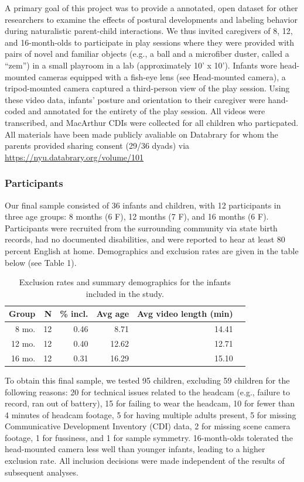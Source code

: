 \documentclass[english,man]{apa6}
\begin{document}
A primary goal of this project was to provide a annotated, open dataset
for other researchers to examine the effects of postural developments
and labeling behavior during naturalistic parent-child interactions. We
thus invited caregivers of 8, 12, and 16-month-olds to participate in
play sessions where they were provided with pairs of novel and familiar
objects (e.g., a ball and a microfiber duster, called a \enquote{zem})
in a small playroom in a lab (approximately 10' x 10'). Infants wore
head-mounted cameras equipped with a fish-eye lens (see Head-mounted
camera), a tripod-mounted camera captured a third-person view of the
play session. Using these video data, infants' posture and orientation
to their caregiver were hand-coded and annotated for the entirety of the
play session. All videos were transcribed, and MacArthur CDIs were
collected for all children who particpated. All materials have been made
publicly avaliable on Databrary for whom the parents provided sharing
consent (29/36 dyads) via \url{https://nyu.databrary.org/volume/101}

\subsubsection{Participants}\label{participants}

Our final sample consisted of 36 infants and children, with 12
participants in three age groups: 8 months (6 F), 12 months (7 F), and
16 months (6 F). Participants were recruited from the surrounding
community via state birth records, had no documented disabilities, and
were reported to hear at least 80 percent English at home. Demographics
and exclusion rates are given in the table below (see Table 1).

\begin{table}[ht]
\centering
\begin{tabular}{rrrrrr}
\hline
Group & N & \% incl. & Avg age & Avg video length (min) \\
\hline
8 mo. &   12 & 0.46 & 8.71 & 14.41 \\
12 mo. &  12 & 0.40 & 12.62 & 12.71 \\
16 mo. &  12 & 0.31 & 16.29 & 15.10\\
\hline
\end{tabular}
\caption{Exclusion rates and summary demographics for the infants included in the study.} 
\end{table}

To obtain this final sample, we tested 95 children, excluding 59
children for the following reasons: 20 for technical issues related to
the headcam (e.g., failure to record, ran out of battery), 15 for
failing to wear the headcam, 10 for fewer than 4 minutes of headcam
footage, 5 for having multiple adults present, 5 for missing
Communicative Development Inventory (CDI) data, 2 for missing scene
camera footage, 1 for fussiness, and 1 for sample symmetry.
16-month-olds tolerated the head-mounted camera less well than younger
infants, leading to a higher exclusion rate. All inclusion decisions
were made independent of the results of subsequent analyses.
\end{document}

